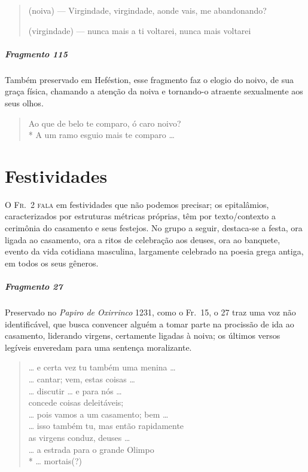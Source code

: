 {\begin{verse}
(noiva) --- Virgindade, virgindade, aonde vais, me abandonando?

(virgindade) --- nunca mais a ti voltarei, nunca mais voltarei
\end{verse}

\paragraph{Fragmento 115}

{\small Também preservado em Heféstion, esse fragmento faz o elogio do noivo, de sua
graça física, chamando a atenção da noiva e tornando-o atraente sexualmente aos
seus olhos. }

\begin{verse}
Ao que de belo te comparo, ó caro noivo?\\*
A um ramo esguio mais te comparo \ldots{}
\end{verse}


\chapter{Festividades}

\textsc{O Fr.~2 fala} em festividades que não podemos precisar; os epitalâmios,
caracterizados por estruturas métricas próprias, têm por texto/contexto a
cerimônia do casamento e seus festejos. No grupo a seguir, destaca-se a festa,
ora ligada ao casamento, ora a ritos de celebração aos deuses, ora ao banquete,
evento da vida cotidiana masculina, largamente celebrado na poesia grega
antiga, em todos os seus gêneros.

\paragraph{Fragmento 27}

{\small Preservado no \textit{Papiro de Oxirrinco} 1231, como o Fr.~15, o 27 traz uma
voz não identificável, que busca convencer alguém a tomar parte na procissão de
ida ao casamento, liderando virgens, certamente ligadas à noiva; os últimos versos
legíveis enveredam para uma sentença moralizante.}

\begin{verse}
\ldots{} e certa vez tu também uma menina \ldots{}\\
\ldots{} cantar; vem, estas coisas \ldots{}\\
\ldots{} discutir \ldots{} e para nós \ldots{}\\
concede coisas deleitáveis;\\
\ldots{} pois vamos a um casamento; bem \ldots{}\\
\ldots{} isso também tu, mas então rapidamente\\
as virgens conduz, deuses \ldots{}\\
\ldots{} a estrada para o grande Olimpo\\*
\ldots{} mortais(?)
\end{verse}

}
